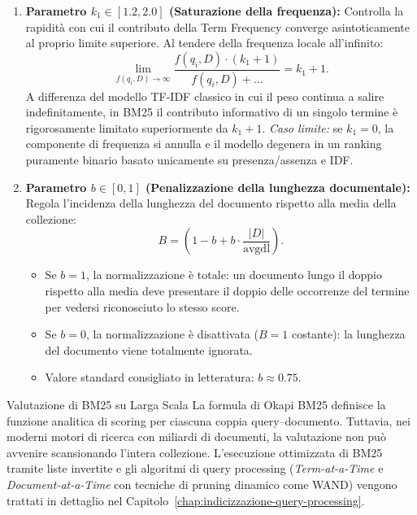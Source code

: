 \begin{enumerate}
    \item \textbf{Parametro $k_1 \in [1.2, 2.0]$ (Saturazione della frequenza):}
    Controlla la rapidit\`a con cui il contributo della Term Frequency converge asintoticamente al proprio limite superiore. Al tendere della frequenza locale all'infinito:
    \begin{equation}
    \lim_{f(q_i, D) \to \infty} \frac{f(q_i, D) \cdot (k_1 + 1)}{f(q_i, D) + \dots} = k_1 + 1.
    \end{equation}
    A differenza del modello TF-IDF classico in cui il peso continua a salire indefinitamente, in BM25 il contributo informativo di un singolo termine \`e rigorosamente limitato superiormente da $k_1 + 1$. 
    \textit{Caso limite:} se $k_1 = 0$, la componente di frequenza si annulla e il modello degenera in un ranking puramente binario basato unicamente su presenza/assenza e IDF.
    
    \item \textbf{Parametro $b \in [0, 1]$ (Penalizzazione della lunghezza documentale):}
    Regola l'incidenza della lunghezza del documento rispetto alla media della collezione:
    \begin{equation}
    B = \left(1 - b + b \cdot \frac{|D|}{\text{avgdl}}\right).
    \end{equation}
    \begin{itemize}
        \item Se $b = 1$, la normalizzazione \`e totale: un documento lungo il doppio rispetto alla media deve presentare il doppio delle occorrenze del termine per vedersi riconosciuto lo stesso score.
        \item Se $b = 0$, la normalizzazione \`e disattivata ($B = 1$ costante): la lunghezza del documento viene totalmente ignorata.
        \item Valore standard consigliato in letteratura: $b \approx 0.75$.
    \end{itemize}
\end{enumerate}

\begin{noteblock}{Valutazione di BM25 su Larga Scala}
La formula di Okapi BM25 definisce la funzione analitica di scoring per ciascuna coppia query--documento. Tuttavia, nei moderni motori di ricerca con miliardi di documenti, la valutazione non pu\`o avvenire scansionando l'intera collezione. L'esecuzione ottimizzata di BM25 tramite liste invertite e gli algoritmi di query processing (\textit{Term-at-a-Time} e \textit{Document-at-a-Time} con tecniche di pruning dinamico come WAND) vengono trattati in dettaglio nel Capitolo~\ref{chap:indicizzazione-query-processing}.
\end{noteblock}

